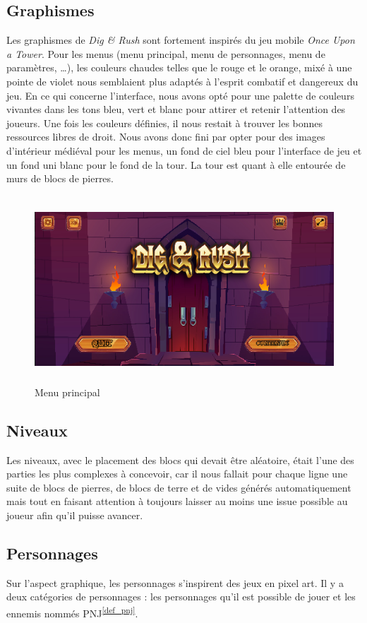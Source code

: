 \documentclass[a4paper,12pt]{article}
\newcommand\refsuscrite[1]{\textsuperscript{\ref{#1}}}
\begin{document}
\subsection{Graphismes}
Les graphismes de \textit{Dig \& Rush} sont fortement inspirés du jeu mobile \textit{Once Upon a Tower}.
Pour les menus (menu principal, menu de personnages, menu de paramètres, \dots), les couleurs  chaudes telles que le rouge et le orange, mixé à une pointe de violet nous semblaient plus adaptés à l'esprit combatif et dangereux du jeu. 
En ce qui concerne l'interface, nous avons opté pour une palette de couleurs vivantes dans les tons bleu, vert et blanc pour attirer et retenir l'attention des joueurs.
Une fois les couleurs définies, il nous restait à trouver les bonnes ressources libres de droit. Nous avons donc fini par opter pour des images d'intérieur médiéval pour les menus, un fond de ciel bleu pour l'interface de jeu et un fond uni blanc pour le fond de la tour.
La tour est quant à elle entourée de murs de blocs de pierres.
\begin{figure}[h]
	\centering
	\includegraphics[height=7cm]{img/menu.png}
	\caption{Menu principal}
	\label{menu}
\end{figure}

\subsection{Niveaux}
Les niveaux, avec le placement des blocs qui devait être aléatoire, était l'une des parties les plus complexes à concevoir, car il nous fallait pour chaque ligne une suite de blocs de pierres, de blocs de terre et de vides générés automatiquement mais tout en faisant attention à toujours laisser au moins une issue possible au joueur afin qu'il puisse avancer.

\subsection{Personnages}
Sur l’aspect graphique, les personnages s’inspirent des jeux en pixel art. 
Il y a deux catégories de personnages : les personnages qu’il est possible de jouer et les ennemis nommés PNJ\refsuscrite{def_pnj}.
\end{document}
